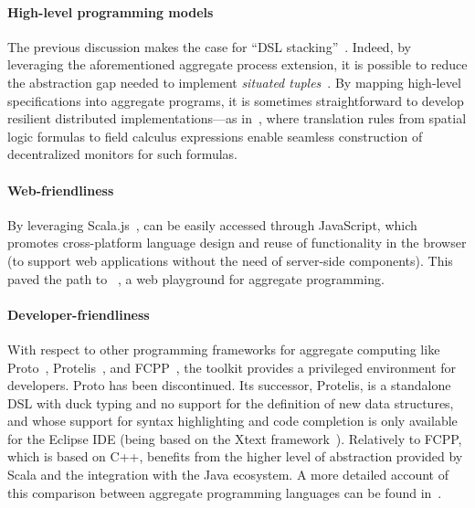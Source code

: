 \paragraph*{High-level programming models}
%
The previous discussion  
 makes the case for ``DSL stacking''~\cite{DBLP:conf/icsoft/HummE10}.
%
Indeed, by leveraging the aforementioned aggregate process extension, 
 it is possible to reduce the abstraction gap
 needed to implement \emph{situated tuples}~\cite{DBLP:conf/coordination/CasadeiVRA21}.
%
By mapping high-level specifications into aggregate programs, it is sometimes straightforward to develop resilient distributed implementations---as in~\cite{DBLP:journals/jss/AudritoCDSV21},
 where translation rules from 
 spatial logic formulas
 to field calculus expressions
 enable seamless construction of decentralized monitors for such formulas.

\paragraph*{Web-friendliness}
%
By leveraging Scala.js~\cite{DBLP:conf/scala/Doeraene18}, \scafi{} can be easily 
 accessed through JavaScript,
 which promotes cross-platform language design 
 and reuse of functionality in the browser
 (to support web applications without the need of server-side components).
%
This paved the path 
 to \scafiweb{}~\cite{DBLP:conf/coordination/AguzziCMPV21},
 a web playground for aggregate programming.
 
\paragraph*{Developer-friendliness}
%
With respect to other programming frameworks for aggregate computing like Proto~, 
 Protelis~\cite{DBLP:conf/sac/PianiniVB15}, 
 and FCPP~\cite{DBLP:conf/acsos/Audrito20}, 
the \scafi{} toolkit provides a privileged environment
for developers.
%
Proto has been discontinued.
%
Its successor, Protelis, is a standalone DSL 
with duck typing and no support for the definition of new data structures,
and whose support for syntax highlighting and code completion is only available for the Eclipse IDE
(being based on the Xtext framework~\cite{XtextBook2016}).
%
Relatively to FCPP, which is based on C++, \scafi{} benefits from the higher level of abstraction provided by Scala and the integration with the Java ecosystem.
%
A more detailed account of this comparison between aggregate programming languages can be found in~\cite{DBLP:journals/jlap/ViroliBDACP19,arxiv2020scafi-nc}.

